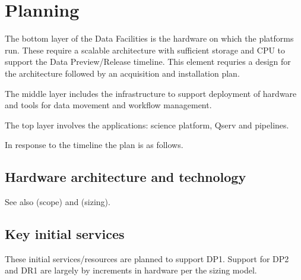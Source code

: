 \section{Planning}\label{sec:plan}

The bottom layer of the Data Facilities is the hardware on which the
platforms run. These require a scalable architecture with sufficient
storage and CPU to support the Data Preview/Release timeline.  This
element requries a design for the architecture followed by an
acquisition and installation plan.

The middle layer includes the infrastructure to support deployment of
hardware and tools for data movement and workflow management.

 The top layer involves the applications: science platform, Qserv and pipelines.

In response to the timeline  the plan is as follows.

\subsection {Hardware architecture and technology}
See also  (scope) and   (sizing).

\subsection{Key initial services}

These initial services/resources are planned to support DP1. Support
for DP2 and DR1 are largely by increments in hardware per the sizing model.

